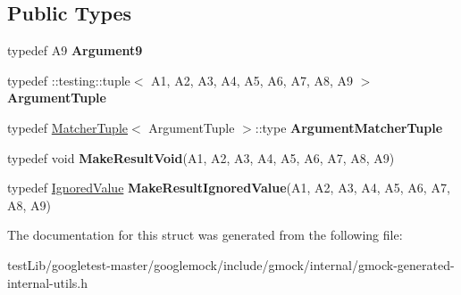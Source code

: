 \subsection*{Public Types}
\begin{DoxyCompactItemize}
\item 
\mbox{\label{structtesting_1_1internal_1_1Function_3_01R_07A1_00_01A2_00_01A3_00_01A4_00_01A5_00_01A6_00_01A7_00_01A8_00_01A9_08_4_a38763fd0186335e863f105ef07c24e7e}} 
typedef A9 {\bfseries Argument9}
\item 
\mbox{\label{structtesting_1_1internal_1_1Function_3_01R_07A1_00_01A2_00_01A3_00_01A4_00_01A5_00_01A6_00_01A7_00_01A8_00_01A9_08_4_a184a525db51d0008a93b6c9ccf0d84e9}} 
typedef \+::testing\+::tuple$<$ A1, A2, A3, A4, A5, A6, A7, A8, A9 $>$ {\bfseries Argument\+Tuple}
\item 
\mbox{\label{structtesting_1_1internal_1_1Function_3_01R_07A1_00_01A2_00_01A3_00_01A4_00_01A5_00_01A6_00_01A7_00_01A8_00_01A9_08_4_a8db40584fce5a62969219c25e40ff307}} 
typedef \hyperlink{structtesting_1_1internal_1_1MatcherTuple}{Matcher\+Tuple}$<$ Argument\+Tuple $>$\+::type {\bfseries Argument\+Matcher\+Tuple}
\item 
\mbox{\label{structtesting_1_1internal_1_1Function_3_01R_07A1_00_01A2_00_01A3_00_01A4_00_01A5_00_01A6_00_01A7_00_01A8_00_01A9_08_4_a22fab485f015d9ddd119279fb6d253cc}} 
typedef void {\bfseries Make\+Result\+Void}(A1, A2, A3, A4, A5, A6, A7, A8, A9)
\item 
\mbox{\label{structtesting_1_1internal_1_1Function_3_01R_07A1_00_01A2_00_01A3_00_01A4_00_01A5_00_01A6_00_01A7_00_01A8_00_01A9_08_4_a32f168fe643707462ca621fc8c5dff2a}} 
typedef \hyperlink{classtesting_1_1internal_1_1IgnoredValue}{Ignored\+Value} {\bfseries Make\+Result\+Ignored\+Value}(A1, A2, A3, A4, A5, A6, A7, A8, A9)
\end{DoxyCompactItemize}


The documentation for this struct was generated from the following file\+:\begin{DoxyCompactItemize}
\item 
test\+Lib/googletest-\/master/googlemock/include/gmock/internal/gmock-\/generated-\/internal-\/utils.\+h\end{DoxyCompactItemize}
